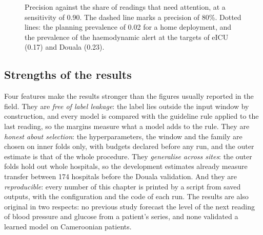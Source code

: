 \documentclass[11pt,a4paper,oneside]{report}
\begin{document}
\begin{figure}[htbp]
\centering
{}
\caption{Precision against the share of readings that need attention, at a sensitivity of 0.90. The dashed line marks a precision of 80\%. Dotted lines: the planning prevalence of 0.02 for a home deployment, and the prevalence of the haemodynamic alert at the targets of eICU (0.17) and Douala (0.23).}\label{fig:ppv-prevalence}
\end{figure}

\subsection{Strengths of the results}\label{sec:strengths}

Four features make the results stronger than the figures usually reported in the field. They are \emph{free of label leakage}: the label lies outside the input window by construction, and every model is compared with the guideline rule applied to the last reading, so the margins measure what a model adds to the rule. They are \emph{honest about selection}: the hyperparameters, the window and the family are chosen on inner folds only, with budgets declared before any run, and the outer estimate is that of the whole procedure. They \emph{generalise across sites}: the outer folds hold out whole hospitals, so the development estimates already measure transfer between 174 hospitals before the Douala validation. And they are \emph{reproducible}: every number of this chapter is printed by a script from saved outputs, with the configuration and the code of each run. The results are also original in two respects: no previous study forecast the level of the next reading of blood pressure and glucose from a patient's series, and none validated a learned model on Cameroonian patients.
\end{document}
